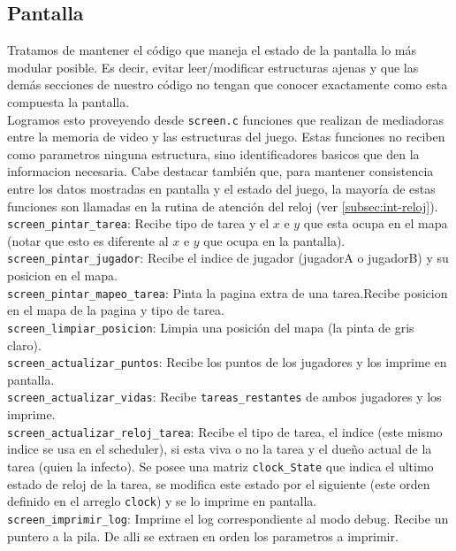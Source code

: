 \vspace{10pt}
\subsection{Pantalla}

Tratamos de mantener el código que maneja el estado de la pantalla lo más modular posible. Es decir, evitar leer/modificar estructuras ajenas  y que las demás secciones de nuestro código no tengan que conocer exactamente como esta compuesta la pantalla.\\

Logramos esto proveyendo desde  \verb|screen.c| funciones que realizan de mediadoras entre la memoria de video y las estructuras del juego. Estas funciones no reciben como parametros ninguna estructura, sino identificadores basicos que den la informacion necesaria. Cabe destacar también que, para mantener consistencia entre los datos mostradas en pantalla y el estado del juego, la mayoría de estas funciones son llamadas en la rutina de atención del reloj (ver \ref{subsec:int-reloj}).\\


\verb|screen_pintar_tarea|: Recibe tipo de tarea y el $x$ e $y$ que esta ocupa en el mapa (notar que esto es diferente al $x$ e $y$ que ocupa en la pantalla).\\

\verb|screen_pintar_jugador|: Recibe el indice de jugador (jugadorA o jugadorB) y su posicion en el mapa.\\

\verb|screen_pintar_mapeo_tarea|: Pinta la pagina extra de una tarea.Recibe posicion en el mapa de la pagina y tipo de tarea.\\

\verb|screen_limpiar_posicion|: Limpia una posición del mapa (la pinta de gris claro).\\

\verb|screen_actualizar_puntos|: Recibe los puntos de los jugadores y los imprime en pantalla.\\

\verb|screen_actualizar_vidas|: Recibe \verb|tareas_restantes| de ambos jugadores y los imprime.\\

\verb|screen_actualizar_reloj_tarea|: Recibe el tipo de tarea, el indice (este mismo indice se usa en el scheduler), si esta viva o no la tarea y el dueño actual de la tarea (quien la infecto). Se posee una matriz \verb|clock_State| que indica el ultimo estado de reloj de la tarea, se modifica este estado por el siguiente (este orden definido en el arreglo \verb|clock|) y se lo imprime en pantalla.\\

\verb|screen_imprimir_log|: Imprime el log correspondiente al modo debug. Recibe un puntero a la pila. De alli se extraen en orden los parametros a imprimir.\\

\newpage

